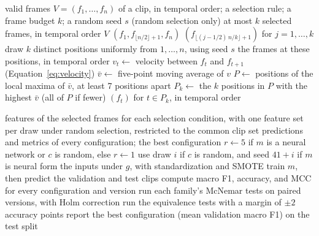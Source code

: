 \begin{algorithm}[t]
   \caption{Frame selection}
   \label{alg:selection}
   \begin{algorithmic}[1]
      \Require valid frames $V = (f_1, \dots, f_n)$ of a clip, in temporal order; a selection rule; a frame budget $k$; a random seed $s$ (random selection only)
      \Ensure at most $k$ selected frames, in temporal order
         \State \Return $V$
      \EndIf
       
         \State \Return $(f_1, f_{\lfloor n/2 \rfloor + 1}, f_n)$
       
         \State \Return $(f_{\lfloor (j - 1/2)\,n/k \rfloor + 1})$ for $j = 1, \dots, k$
         \State draw $k$ distinct positions uniformly from $1, \dots, n$, using seed $s$
         \State \Return the frames at these positions, in temporal order
      \Else {}
            \State $v_t \gets$ velocity between $f_t$ and $f_{t+1}$ (Equation~\ref{eq:velocity})
         \EndFor
         \State $\bar{v} \gets$ five-point moving average of $v$
         \State $P \gets$ positions of the local maxima of $\bar{v}$, at least 7 positions apart
         \State $P_k \gets$ the $k$ positions in $P$ with the highest $\bar{v}$ (all of $P$ if fewer)
         \State \Return $(f_t)$ for $t \in P_k$, in temporal order
      \EndIf
   \end{algorithmic}
\end{algorithm}

\begin{algorithm}[t]
   \caption{Training and evaluation of all configurations}
   \label{alg:evaluation}
   \begin{algorithmic}[1]
      \Require features of the selected frames for each selection condition, with one feature set per draw under random selection, restricted to the common clip set
      \Ensure predictions and metrics of every configuration; the best configuration
         \State $r \gets 5$ if $m$ is a neural network or $c$ is random, else $r \gets 1$
          
            \State use draw $i$ if $c$ is random, and seed $41 + i$ if $m$ is neural
            \State form the inputs under $g$, with standardization and SMOTE
            \State train $m$, then predict the validation and test clips
         \EndFor
      \EndFor
      \State compute macro F1, accuracy, and MCC for every configuration and version
      \State run each family's McNemar tests on paired versions, with Holm correction
      \State run the equivalence tests with a margin of $\pm 2$ accuracy points
      \State report the best configuration (mean validation macro F1) on the test split
   \end{algorithmic}
\end{algorithm}

